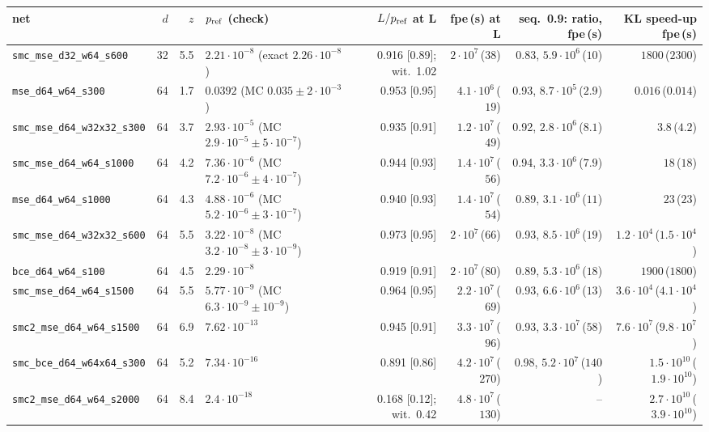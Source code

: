 \begin{tabular}{lrrlrrrr}
\toprule
net & $d$ & $z$ & $p_{\rm ref}$ (check) & $L/p_{\rm ref}$ at L & fpe\,(s) at L & seq.\ 0.9: ratio, fpe\,(s) & KL speed-up fpe\,(s)\\
\midrule
\texttt{smc\_mse\_d32\_w64\_s600} & 32 & 5.5 & $2.21\cdot10^{-8}$ (exact $2.26\cdot10^{-8}$) & 0.916 [0.89]; wit.\ 1.02 & $2\cdot10^{7}$\,($38$) & 0.83, $5.9\cdot10^{6}$\,($10$) & $1800$\,($2300$)\\
\texttt{mse\_d64\_w64\_s300} & 64 & 1.7 & $0.0392$ (MC $0.035\pm2\cdot10^{-3}$) & 0.953 [0.95] & $4.1\cdot10^{6}$\,($19$) & 0.93, $8.7\cdot10^{5}$\,($2.9$) & $0.016$\,($0.014$)\\
\texttt{smc\_mse\_d64\_w32x32\_s300} & 64 & 3.7 & $2.93\cdot10^{-5}$ (MC $2.9\cdot10^{-5}\pm5\cdot10^{-7}$) & 0.935 [0.91] & $1.2\cdot10^{7}$\,($49$) & 0.92, $2.8\cdot10^{6}$\,($8.1$) & $3.8$\,($4.2$)\\
\texttt{smc\_mse\_d64\_w64\_s1000} & 64 & 4.2 & $7.36\cdot10^{-6}$ (MC $7.2\cdot10^{-6}\pm4\cdot10^{-7}$) & 0.944 [0.93] & $1.4\cdot10^{7}$\,($56$) & 0.94, $3.3\cdot10^{6}$\,($7.9$) & $18$\,($18$)\\
\texttt{mse\_d64\_w64\_s1000} & 64 & 4.3 & $4.88\cdot10^{-6}$ (MC $5.2\cdot10^{-6}\pm3\cdot10^{-7}$) & 0.940 [0.93] & $1.4\cdot10^{7}$\,($54$) & 0.89, $3.1\cdot10^{6}$\,($11$) & $23$\,($23$)\\
\texttt{smc\_mse\_d64\_w32x32\_s600} & 64 & 5.5 & $3.22\cdot10^{-8}$ (MC $3.2\cdot10^{-8}\pm3\cdot10^{-9}$) & 0.973 [0.95] & $2\cdot10^{7}$\,($66$) & 0.93, $8.5\cdot10^{6}$\,($19$) & $1.2\cdot10^{4}$\,($1.5\cdot10^{4}$)\\
\texttt{bce\_d64\_w64\_s100} & 64 & 4.5 & $2.29\cdot10^{-8}$ & 0.919 [0.91] & $2\cdot10^{7}$\,($80$) & 0.89, $5.3\cdot10^{6}$\,($18$) & $1900$\,($1800$)\\
\texttt{smc\_mse\_d64\_w64\_s1500} & 64 & 5.5 & $5.77\cdot10^{-9}$ (MC $6.3\cdot10^{-9}\pm10^{-9}$) & 0.964 [0.95] & $2.2\cdot10^{7}$\,($69$) & 0.93, $6.6\cdot10^{6}$\,($13$) & $3.6\cdot10^{4}$\,($4.1\cdot10^{4}$)\\
\texttt{smc2\_mse\_d64\_w64\_s1500} & 64 & 6.9 & $7.62\cdot10^{-13}$ & 0.945 [0.91] & $3.3\cdot10^{7}$\,($96$) & 0.93, $3.3\cdot10^{7}$\,($58$) & $7.6\cdot10^{7}$\,($9.8\cdot10^{7}$)\\
\texttt{smc\_bce\_d64\_w64x64\_s300} & 64 & 5.2 & $7.34\cdot10^{-16}$ & 0.891 [0.86] & $4.2\cdot10^{7}$\,($270$) & 0.98, $5.2\cdot10^{7}$\,($140$) & $1.5\cdot10^{10}$\,($1.9\cdot10^{10}$)\\
\texttt{smc2\_mse\_d64\_w64\_s2000} & 64 & 8.4 & $2.4\cdot10^{-18}$ & 0.168 [0.12]; wit.\ 0.42 & $4.8\cdot10^{7}$\,($130$) & -- & $2.7\cdot10^{10}$\,($3.9\cdot10^{10}$)\\

\end{tabular}
